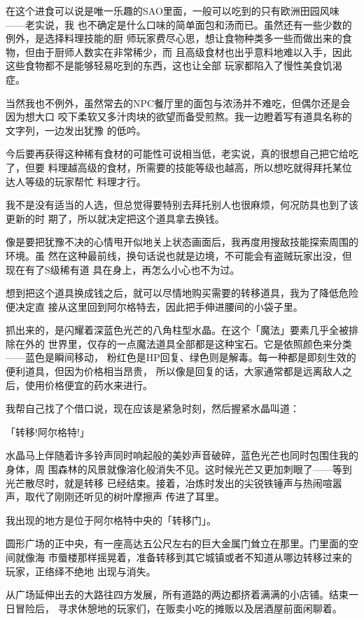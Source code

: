 \documentclass[11pt]{book}
\begin{document}
在这个进食可以说是唯一乐趣的SAO里面，一般可以吃到的只有欧洲田园风味——老实说，我
也不确定是什么口味的简单面包和汤而已。虽然还有一些少数的例外，是选择料理技能的厨
师玩家费尽心思，想让食物种类多一些而做出来的食物，但由于厨师人数实在非常稀少，而
且高级食材也出乎意料地难以入手，因此这些食物都不是能够轻易吃到的东西，这也让全部
玩家都陷入了慢性美食饥渴症。

当然我也不例外，虽然常去的NPC餐厅里的面包与浓汤并不难吃，但偶尔还是会因为想大口
咬下柔软又多汁肉块的欲望而备受煎熬。我一边瞪着写有道具名称的文字列，一边发出犹豫
的低吟。

今后要再获得这种稀有食材的可能性可说相当低，老实说，真的很想自己把它给吃了，但要
料理越高级的食材，所需要的技能等级也越高，所以想吃就得拜托某位达人等级的玩家帮忙
料理才行。

我不是没有适当的人选，但总觉得要特别去拜托别人也很麻烦，何况防具也到了该更新的时
期了，所以就决定把这个道具拿去换钱。

像是要把犹豫不决的心情甩开似地关上状态画面后，我再度用搜敌技能探索周围的环境。虽
然在这种最前线，换句话说也就是边境，不可能会有盗贼玩家出没，但现在有了S级稀有道
具在身上，再怎么小心也不为过。

想到把这个道具换成钱之后，就可以尽情地购买需要的转移道具，我为了降低危险便决定直
接从这里回到阿尔格特去，因此把手伸进腰间的小袋子里。

抓出来的，是闪耀着深蓝色光芒的八角柱型水晶。在这个「魔法」要素几乎全被排除在外的
世界里，仅存的一点魔法道具全部都是这种宝石。它是依照颜色来分类——蓝色是瞬间移动，
粉红色是HP回复、绿色则是解毒。每一种都是即刻生效的便利道具，但因为价格相当昂贵，
所以像是回复的话，大家通常都是远离敌人之后，使用价格便宜的药水来进行。

我帮自己找了个借口说，现在应该是紧急时刻，然后握紧水晶叫道：

「转移!阿尔格特!」

水晶马上伴随着许多铃声同时响起般的美妙声音破碎，蓝色光芒也同时包围住我的身体，周
围森林的风景就像溶化般消失不见。这时候光芒又更加刺眼了——等到光芒散尽时，就是转移
已经结束。接着，冶炼时发出的尖锐铁锤声与热闹喧嚣声，取代了刚刚还听见的树叶摩擦声
传进了耳里。

我出现的地方是位于阿尔格特中央的「转移门」。

圆形广场的正中央，有一座高达五公尺左右的巨大金属门耸立在那里。门里面的空间就像海
市蜃楼那样摇晃着，准备转移到其它城镇或者不知道从哪边转移过来的玩家，正络绎不绝地
出现与消失。

从广场延伸出去的大路往四方发展，所有道路的两边都挤着满满的小店铺。结束一日冒险后，
寻求休憩地的玩家们，在贩卖小吃的摊贩以及居酒屋前面闲聊着。
\end{document}
